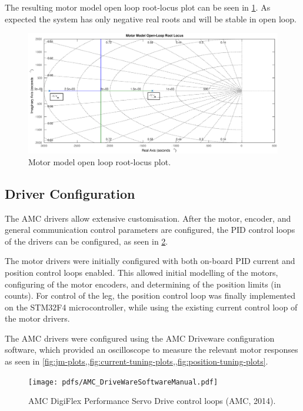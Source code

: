 The resulting motor model open loop root-locus plot can be seen in \cref{fig:ol-motor-rlocus}. As expected the system has only negative real roots and will be stable in open loop.

\begin{figure}
\centering
\includegraphics[width=1\textwidth]{images/motor/ol-motor-rlocus} 
\caption{Motor model open loop root-locus plot.}
\label{fig:ol-motor-rlocus}
\end{figure}


\subsection{Driver Configuration}

The AMC drivers allow extensive customisation. After the motor, encoder, and general communication control parameters are configured, the PID control loops of the drivers can be configured, as seen in \cref{fig:AMCControlLoops}.

The motor drivers were initially configured with both on-board PID current and position control loops enabled. This allowed initial modelling of the motors, configuring of the motor encoders, and determining of the position limits (in counts). For control of the leg, the position control loop was finally implemented on the STM32F4 microcontroller, while using the existing current control loop of the motor drivers.

The AMC drivers were configured using the AMC Driveware configuration software, which provided an oscilloscope to measure the relevant motor responses as seen in \cref{fig:jm-plots,,fig:current-tuning-plots,,fig:position-tuning-plots}.

\begin{figure}
\centering
\texttt{[image: pdfs/AMC\_DriveWareSoftwareManual.pdf]} 
\caption{AMC DigiFlex Performance Servo Drive control loops (AMC, 2014).}
\label{fig:AMCControlLoops}
\end{figure}


